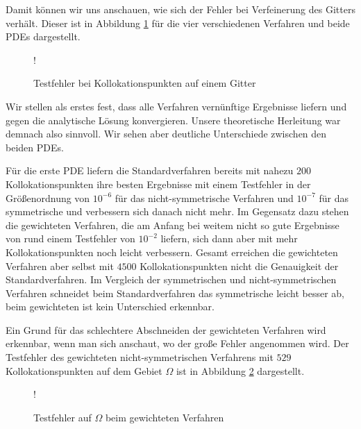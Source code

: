 Damit können wir uns anschauen, wie sich der Fehler bei Verfeinerung des Gitters verhält. Dieser ist in Abbildung \ref{fig:error-grid-both} für die vier verschiedenen Verfahren und beide \acp{PDE} dargestellt. 
%
\begin{figure}[ht]
\centering
\resizebox {\columnwidth} {!} {

}
\caption{Testfehler bei Kollokationspunkten auf einem Gitter}
\label{fig:error-grid-both}
\end{figure}

Wir stellen als erstes fest, dass alle Verfahren vernünftige Ergebnisse liefern und gegen die analytische Lösung konvergieren. Unsere theoretische Herleitung war demnach also sinnvoll. Wir sehen aber deutliche Unterschiede zwischen den beiden \acp{PDE}.

Für die erste \ac{PDE} liefern die Standardverfahren bereits mit nahezu $200$ Kollokationspunkten ihre besten Ergebnisse mit einem Testfehler in der Größenordnung von $10^{-6}$ für das nicht-symmetrische Verfahren und $10^{-7}$ für das symmetrische und verbessern sich danach nicht mehr. Im Gegensatz dazu stehen die gewichteten Verfahren, die am Anfang bei weitem nicht so gute Ergebnisse von rund einem Testfehler von $10^{-2}$ liefern, sich dann aber mit mehr Kollokationspunkten noch leicht verbessern. Gesamt erreichen die gewichteten Verfahren aber selbst mit $4500$ Kollokationspunkten nicht die Genauigkeit der Standardverfahren. Im Vergleich der symmetrischen und nicht-symmetrischen Verfahren schneidet beim Standardverfahren das symmetrische leicht besser ab, beim gewichteten ist kein Unterschied erkennbar.

Ein Grund für das schlechtere Abschneiden der gewichteten Verfahren wird erkennbar, wenn man sich anschaut, wo der große Fehler angenommen wird. Der Testfehler des gewichteten nicht-symmetrischen Verfahrens mit $529$ Kollokationspunkten auf dem Gebiet $\Omega$ ist in Abbildung \ref{fig:Vergleich} dargestellt.

\begin{figure}[ht]
\centering
\resizebox {.7\columnwidth} {!} {

}
\caption{Testfehler auf $\Omega$ beim gewichteten Verfahren}
\label{fig:Vergleich}
\end{figure}

